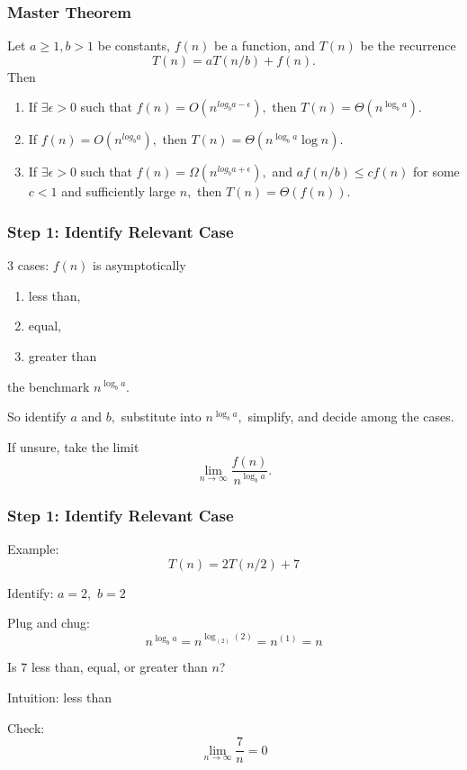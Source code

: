 \documentclass{beamer}
\begin{document}
\begin{frame} \frametitle{Master Theorem}
Let $a \geq 1, b>1$ be constants, $f(n)$ be a function, and $T(n)$ be the recurrence
\[ T(n) = a T(n/b) +f(n) . \]
Then
\begin{enumerate}
  \item If $\exists \epsilon>0$ such that $f(n) = O(n^{log_b a-\epsilon}),$ then $T(n)=\Theta(n^{\log_b a}).$
  \item If $f(n) = O(n^{log_b a}),$ then $T(n)=\Theta(n^{\log_b a} \log n).$
  \item If $\exists \epsilon>0$ such that $f(n) = \Omega(n^{log_b a+\epsilon}),$
    and $a f(n/b) \leq cf(n)$ for some $c<1$ and sufficiently large $n,$
    then $T(n)=\Theta(f(n)).$
\end{enumerate}
\end{frame}

\begin{frame} \frametitle{Step 1: Identify Relevant Case}
  3 cases: $f(n)$ is asymptotically
  \begin{enumerate}
    \item less than,
    \item equal,
    \item greater than
  \end{enumerate}
  the benchmark $ n^{\log_b a} .$
  \vspace{10pt}

  So identify $a$ and $b,$ substitute into $n^{\log_b a},$ simplify, and decide among the cases.
  \vspace{10pt}

  If unsure, take the limit
  \[ \lim_{n \rightarrow \infty} \frac{f(n)}{n^{\log_b a}} . \]
\end{frame}

\begin{frame} \frametitle{Step 1: Identify Relevant Case}
  Example:
  \[ T(n) = 2 T(n/2) + 7 \]

  Identify: $a=2,$ $b=2$

  Plug and chug:
  \[ n^{\log_b a} = n^{\log_{(2)} (2)} = n^{(1)} = n \]

  Is $7$ less than, equal, or greater than $n$? \vspace{10pt}

  Intuition: less than \vspace{10pt}

  Check:
  \[ \lim_{n \rightarrow \infty} \frac{7}{n} = 0 \]
 \end{frame}
\end{document}
